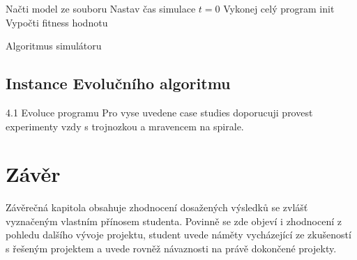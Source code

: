 
\begin{algorithm}[H]
    Načti model ze souboru\;
    Nastav čas simulace $t = 0$\;
    Vykonej celý program init\;
    Vypočti fitness hodnotu\;
    \caption{Algoritmus simulátoru}
    \label{alg:algoritmus_simulatoru}
\end{algorithm}

\section{Instance Evolučního algoritmu}



4.1 Evoluce programu
Pro vyse uvedene case studies doporucuji provest experimenty vzdy s
trojnozkou a mravencem na spirale.



\chapter{Závěr}
Závěrečná kapitola obsahuje zhodnocení dosažených výsledků se zvlášť vyznačeným vlastním přínosem studenta. Povinně se zde objeví i zhodnocení z pohledu dalšího vývoje projektu, student uvede náměty vycházející ze zkušeností s řešeným projektem a uvede rovněž návaznosti na právě dokončené projekty.

